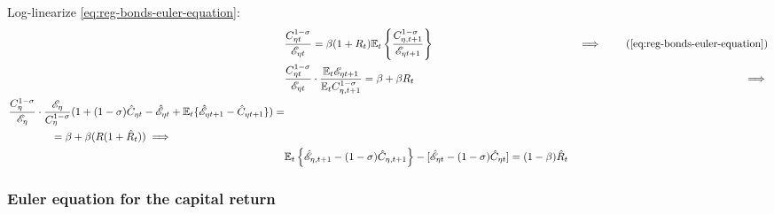 \documentclass[../thesis.tex]{subfiles}
\begin{document}
Log-linearize \ref{eq:reg-bonds-euler-equation}:
\begin{alignat}{2}
	& \frac{ C_{\eta t}^{1-\sigma}}{ \te} = \beta (1 + R_{t}) \E \left\{ \frac{ C_{\eta, t+1}^{1-\sigma}}{ \te[t+1]} \right\} &\implies \tag{\ref{eq:reg-bonds-euler-equation}}\\
	& \frac{ C_{\eta t}^{1-\sigma}}{\te} \cdot \frac{\E \te[t+1]}{\E C_{\eta, t+1}^{1-\sigma}} = \beta + \beta R_{t} &\implies \nonumber \\
	\begin{split}
		& \frac{C_{\eta}^{1-\sigma}}{\te[]} \cdot \frac{\te[]}{C_{\eta}^{1-\sigma}} (1 + (1-\sigma) \hat{C}_{\eta t} - \hat{\mathscr{E}}_{\eta t} + \E \{ \hat{\mathscr{E}}_{\eta t+1} - \hat{C}_{\eta t+1} \}) = \\ & \qquad \qquad = \beta + \beta (R(1 + \hat{R}_{t})) \implies
	\end{split} \nonumber \\
	& \E \left\{ \hat{\mathscr{E}}_{\eta, t+1} - (1 -\sigma)\hat{C}_{\eta, t+1} \right\} - [\hat{\mathscr{E}}_{\eta t} - (1 -\sigma)\hat{C}_{\eta t}] = (1 -\beta) \hat{R}_{t} \label{eq:reg-ll-bonds-euler-equation}
\end{alignat}


\subsubsection*{Euler equation for the capital return}
\end{document}
